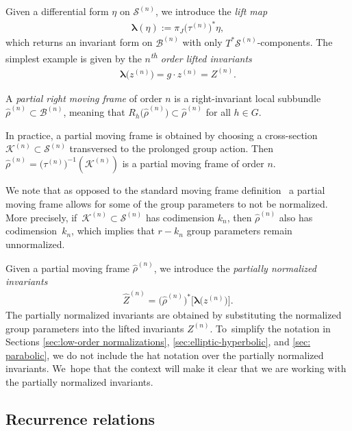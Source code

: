 \documentclass[10pt,a4paper]{amsart}
\numberwithin{equation}{section}
\newcommand{\B}{\mathcal{B}}
\newcommand{\K}{\mathcal{K}}
\newcommand{\bl}{\boldsymbol{\lambda}}
\newcommand{\n}{^{(n)}}
\newcommand{\mS}{\mathcal{S}}
\begin{document}
Given a differential form $\eta$ on $\mathcal{S}\n$, we introduce the \emph{lift map}
\begin{gather}\label{eq:lift}
\bl(\eta):=\pi_J\big(\tau\n\big)^*\eta,
\end{gather}
which returns an invariant form on $\B\n$ with only $T^*\mS\n$-components. The simplest example is given by the \emph{$n$\textsuperscript{th} order lifted invariants}
\begin{gather*}
\bl\big(z\n\big)=g\cdot z\n=Z\n.
\end{gather*}
\begin{Definition}
A \emph{partial right moving frame} of order $n$ is a right-invariant local subbundle $\widehat{\rho}\n \subset \B\n$, meaning that $R_h\big(\widehat{\rho}\n\big) \subset \widehat{\rho}\n$ for all $h\in G$.
\end{Definition}

In practice, a partial moving frame is obtained by choosing a cross-section $\K\n\subset \mS\n$ transversed to the prolonged group action. Then $\widehat{\rho}\n =\big(\tau\n\big)^{-1}(\mathcal{K}\n)$ is a partial moving frame of order $n$.

\begin{Remark}
We note that as opposed to the standard moving frame definition~\cite{FO-1999} a partial moving frame allows for some of the group parameters to not be normalized. More precisely, if~$\K\n\subset \mS\n$ has codimension $k_n$, then $\widehat{\rho}\n$ also has codimension~$k_n$, which implies that $r-k_n$ group parameters remain unnormalized.
\end{Remark}

Given a partial moving frame $\widehat{\rho}\n$, we introduce the \emph{partially normalized invariants}
\begin{gather*}
\widehat{Z}\n =\big(\widehat{\rho}\n\big)^*\big[\bl\big(z\n\big)\big].
\end{gather*}
The partially normalized invariants are obtained by substituting the normalized group parameters into the lifted invariants $Z\n$. To~simplify the notation in Sections \ref{sec:low-order normalizations}, \ref{sec:elliptic-hyperbolic}, and \ref{sec: parabolic}, we do not include the hat notation over the partially normalized invariants. We~hope that the context will make it clear that we are working with the partially normalized invariants.

\subsection{Recurrence relations}
\end{document}
